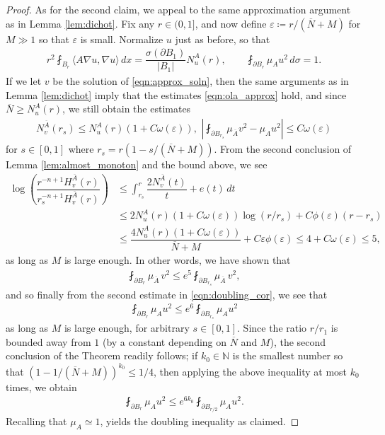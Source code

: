 \documentclass[12pt,leqno]{amsart}
\numberwithin{equation}{section}
\theoremstyle{definition}
\newcommand{\N}{\mathbb{N}}
\renewcommand{\epsilon}{\varepsilon}
\newcommand{\abs}[1]{\left \lvert #1 \right \rvert}
\newcommand{\ol}{\overline}
\begin{document}
\begin{proof}
		As for the second claim, we appeal to the same approximation argument as in Lemma \ref{lem:dichot}. Fix any $r \in (0, 1]$, and now define $\epsilon \coloneqq r/(\ol{N} + M)$ for $M \gg 1$ so that $\epsilon$ is small. Normalize $u$ just as before, so that 
		\begin{align*}
			r^2 \fint_{B_r} \langle A \nabla u, \nabla u \rangle  \, dx  = \dfrac{\sigma(\partial B_1)}{\abs{B_1}} N_u^A(r), \qquad \fint_{\partial B_r} \mu_Au^2 \, d\sigma  = 1.
		\end{align*}
		If we let $v$ be the solution of \eqref{eqn:approx_soln}, then the same arguments as in Lemma \ref{lem:dichot} imply that the estimates \eqref{eqn:ola_approx} hold, and since $\ol{N} \ge N_u^A(r)$, we still obtain the estimates
		\begin{align}\label{eqn:doubling_cor}
			N_v^{\ol{A}}(r_s) \le N_u^A(r)(1 + C \omega(\epsilon)), \, \,  \abs{ \fint_{\partial B_{r_s}}  \mu_{\ol{A}} v^2 - \mu_A u^2    } \le C \omega(\epsilon)
		\end{align}
		for $ s \in [0,1]$ where $r_s = r(1-s/(\ol{N} + M))$. From the second conclusion of Lemma \ref{lem:almost_monoton} and the bound above, we see
		\begin{align*}
			\log \left( \dfrac{ r^{-n+1} H_v^{\ol{A}}(r)    }{  r_s^{-n+1} H_v^{\ol{A}}(r)  }  \right) & \le \int_{r_s}^r \dfrac{2 N_v^{\ol{A}}(t)}{t} + e(t) \, dt \\
			& \le 2N_u^{A}(r)(1 + C \omega(\epsilon)) \log(r/r_s) + C \phi(\epsilon) (r-r_s) \\
			& \le \dfrac{4 N_u^A(r)(1 + C \omega(\epsilon))}{\ol{N} + M } + C \epsilon \phi(\epsilon) \le 4  + C \omega(\epsilon) \le 5,
		\end{align*}
		as long as $M$ is large enough. In other words, we have shown that 
		\begin{align*}
			\fint_{\partial B_r} \mu_{\ol{A}} \, v^2 \le e^5 \fint_{\partial B_{r_s}} \mu_{\ol{A}} \, v^2,
		\end{align*}
		and so finally from the second estimate in \eqref{eqn:doubling_cor}, we see that 
		\begin{align*}
			\fint_{\partial B_r} \mu_A u^2 \le e^6 \fint_{\partial B_{r_s}} \mu_A u^2
		\end{align*}
		as long as $M$ is large enough, for arbitrary $s \in [0,1]$. Since the ratio $r/r_1$ is bounded away from $1$ (by a constant depending on $\ol{N}$ and $M$), the second conclusion of the Theorem readily follows; if $k_0 \in \N$ is the smallest number so that $(1-1/(\ol{N} + M))^{k_0} \le 1/4$, then applying the above inequality at most $ k_0$ times, we obtain
		\begin{align*}
			\fint_{\partial B_{r}} \mu_A u^2 \le e^{ 6 {k_0} } \fint_{\partial B_{r/2}} \mu_A u^2.
		\end{align*}
		Recalling that $\mu_A \simeq 1$, yields the doubling inequality as claimed.
	\end{proof}
	
\end{document}
